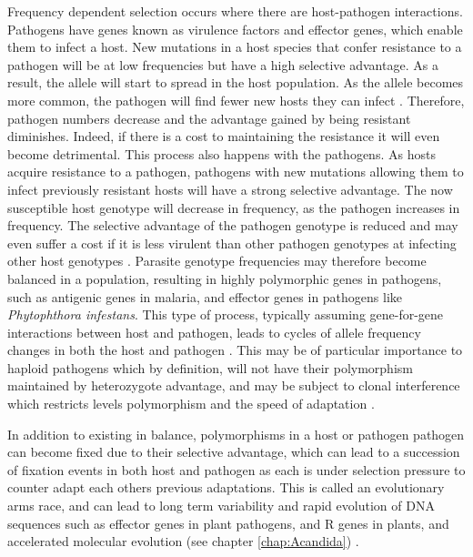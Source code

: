 Frequency dependent selection occurs where there are host-pathogen interactions.
Pathogens have genes known as virulence factors and effector genes, which enable them to infect a host.
New mutations in a host species that confer resistance to a pathogen will be at low frequencies but have a high selective advantage.
As a result, the allele will start to spread in the host population.
As the allele becomes more common, the pathogen will find fewer new hosts they can infect \parencite{Charlesworth2006,Frank1993,Seger1988}.
Therefore, pathogen numbers decrease and the advantage gained by being resistant diminishes.
Indeed, if there is a cost to maintaining the resistance it will even become detrimental.
This process also happens with the pathogens.
As hosts acquire resistance to a pathogen, pathogens with new mutations allowing them to infect previously resistant hosts will have a strong selective advantage.
The now susceptible host genotype will decrease in frequency, as the pathogen increases in frequency.
The selective advantage of the pathogen genotype is reduced and may even suffer a cost if it is less virulent than other pathogen genotypes at infecting other host genotypes \parencite{Charlesworth2006,Frank1993,Seger1988}.
Parasite genotype frequencies may therefore become balanced in a population, resulting in highly polymorphic genes in pathogens, such as antigenic genes in malaria, and effector genes in pathogens like \textit{Phytophthora infestans}\parencite{Morgan2007,Policy2001}.
This type of process, typically assuming gene-for-gene interactions between host and pathogen, leads to cycles of allele frequency changes in both the host and pathogen \parencite{May1983}.
This may be of particular importance to haploid pathogens which by definition, will not have their polymorphism maintained by heterozygote advantage, and may be subject to clonal interference which restricts levels polymorphism and the speed of adaptation \parencite{Gerrish1998}.

In addition to existing in balance, polymorphisms in a host or pathogen pathogen can become fixed due to their selective advantage, which can lead to a succession of fixation events in both host and pathogen as each is under selection pressure to counter adapt each others previous adaptations.
This is called an evolutionary arms race, and can lead to long term variability and rapid evolution of DNA sequences such as effector genes in plant pathogens, and R genes in plants, and accelerated molecular evolution (see chapter \ref{chap:Acandida}) \parencite{Brown2003,Charlesworth2006,Morgan2007,Paterson2010,Rose2004}.

